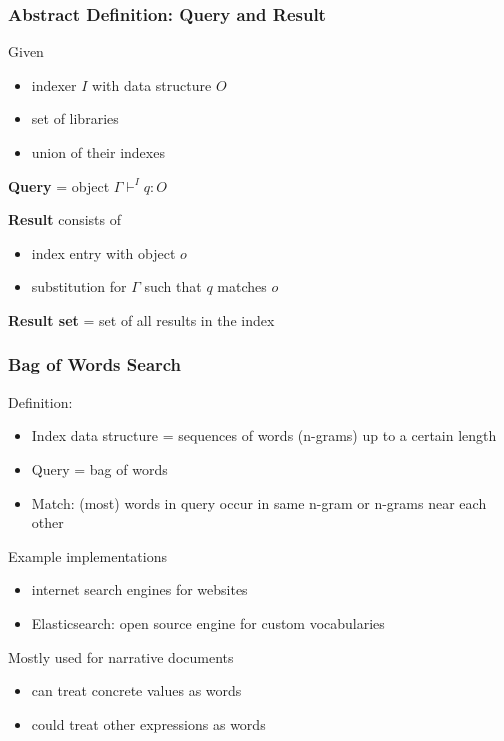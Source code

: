 \begin{frame}\frametitle{Abstract Definition: Query and Result}
Given
\begin{itemize}
\item indexer $I$ with data structure $O$
\item set of libraries
\item union of their indexes  
\end{itemize}

\textbf{Query} = object $\Gamma \vdash^I q:O$

\textbf{Result} consists of
\begin{itemize}
\item index entry with object $o$
\item substitution for $\Gamma$ such that $q$ matches $o$
\end{itemize}

\textbf{Result set} = set of all results in the index
\end{frame}

\begin{frame}\frametitle{Bag of Words Search}
Definition:
\begin{itemize}
\item Index data structure = sequences of words (n-grams) up to a certain length
\item Query = bag of words
\item Match: (most) words in query occur in same n-gram or n-grams near each other
\end{itemize}

Example implementations
 \begin{itemize}
 \item internet search engines for websites
 \item Elasticsearch: open source engine for custom vocabularies
 \end{itemize}

Mostly used for narrative documents
\begin{itemize}
 \item can treat concrete values as words 
 \item could treat other expressions as words 
\end{itemize}

\end{frame}

